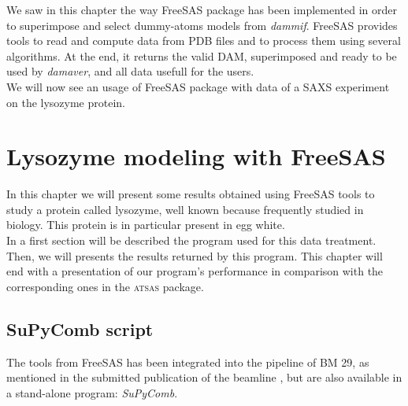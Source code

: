 \documentclass[a4paper, 11pt]{report}
\begin{document}
We saw in this chapter the way FreeSAS package has been implemented in 
order to superimpose and select dummy-atoms models from 
\textit{dammif}. 
FreeSAS provides tools to read and compute data from PDB files and to 
process them using several algorithms. 
At the end, it returns the valid DAM, superimposed and ready to be 
used by \textit{damaver}, and all data usefull for the users.\\
We will now see an usage of FreeSAS package with data of a SAXS 
experiment on the lysozyme protein.


\chapter{Lysozyme modeling with FreeSAS}%

In this chapter we will present some results obtained using FreeSAS 
tools to study a protein called lysozyme, well known because 
frequently studied in biology. 
This protein is in particular present in egg white.\\
In a first section will be described the program used for this data 
treatment. 
Then, we will presents the results returned by this program. 
This chapter will end with a presentation of our program's performance 
in comparison with the corresponding ones in the \textsc{atsas} 
package.

\section{SuPyComb script}

The tools from FreeSAS has been integrated into the pipeline of BM 29, 
as mentioned in the submitted publication of the beamline 
\cite{bm29news}, but are also available in a stand-alone program: 
\textit{SuPyComb}.\\
\end{document}
